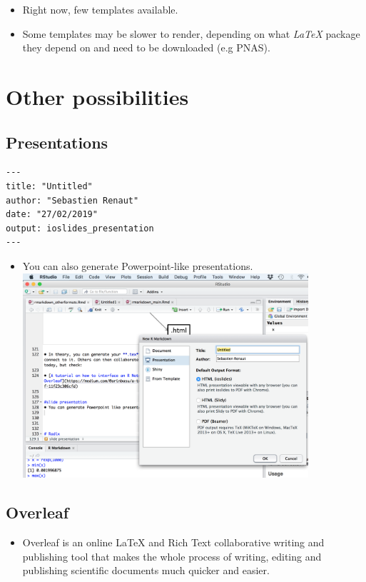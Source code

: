 \documentclass[]{article}
\providecommand{\tightlist}{%
  \setlength{\itemsep}{0pt}\setlength{\parskip}{0pt}}
\begin{document}
\begin{itemize}
\item
  Right now, few templates available.
\item
  Some templates may be slower to render, depending on what \emph{LaTeX}
  package they depend on and need to be downloaded (e.g PNAS).
\end{itemize}

\hypertarget{other-possibilities}{%
\section{Other possibilities}\label{other-possibilities}}

\hypertarget{presentations}{%
\subsection{Presentations}\label{presentations}}

\begin{verbatim}
---
title: "Untitled"
author: "Sebastien Renaut"
date: "27/02/2019"
output: ioslides_presentation
---
\end{verbatim}

\begin{itemize}
\tightlist
\item
  You can also generate Powerpoint-like presentations.
  \includegraphics[width=4.16667in,height=\textheight]{../figures/slides.png}
\end{itemize}

\hypertarget{overleaf}{%
\subsection{Overleaf}\label{overleaf}}

\begin{itemize}
\tightlist
\item
  Overleaf is an online LaTeX and Rich Text collaborative writing and
  publishing tool that makes the whole process of writing, editing and
  publishing scientific documents much quicker and easier.
\end{itemize}
\end{document}
